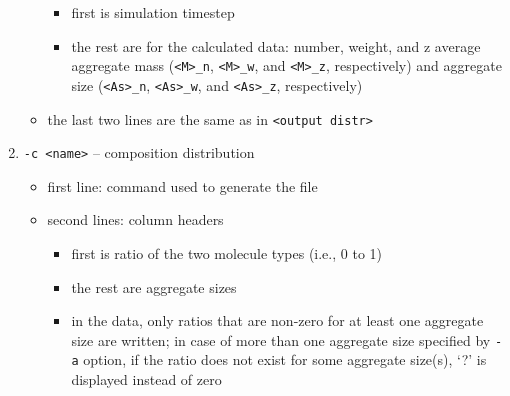 \begin{enumerate}[nosep,leftmargin=20pt]
\begin{itemize}[nosep,leftmargin=5pt]
      \begin{itemize}[nosep,leftmargin=10pt]
        \item first is simulation timestep
        \item the rest are for the calculated data: number, weight, and z
          average aggregate mass (\texttt{<M>\_n}, \texttt{<M>\_w}, and
          \texttt{<M>\_z}, respectively) and aggregate size
          (\texttt{<As>\_n}, \texttt{<As>\_w}, and \texttt{<As>\_z},
          respectively)
      \end{itemize}
    \item the last two lines are the same as in \texttt{<output distr>}
  \end{itemize}
\item \texttt{-c <name>} -- composition distribution
  \begin{itemize}[nosep,leftmargin=5pt]
    \item first line: command used to generate the file
    \item second lines: column headers
      \begin{itemize}[nosep,leftmargin=10pt]
        \item first is ratio of the two molecule types (i.e., 0 to 1)
        \item the rest are aggregate sizes
        \item in the data, only ratios that are non-zero for at least one
          aggregate size are written; in case of more than one aggregate
          size specified by \texttt{-a} option, if the ratio does not exist
          for some aggregate size(s), `?' is displayed instead of zero
      \end{itemize}
  \end{itemize}
\end{enumerate}
